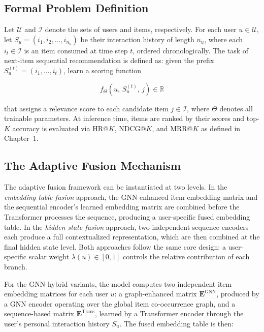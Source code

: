 \documentclass[12pt,a4paper]{report}
\begin{document}
\subsection{Formal Problem Definition}

Let \(\mathcal{U}\) and \(\mathcal{I}\) denote the sets of users and items,
respectively. For each user \(u \in \mathcal{U}\), let
\(S_u = (i_1, i_2, \ldots, i_{n_u})\) be their interaction history of length
\(n_u\), where each \(i_t \in \mathcal{I}\) is an item consumed at time step
\(t\), ordered chronologically. The task of next-item sequential recommendation
is defined as: given the prefix \(S_u^{(t)} = (i_1, \ldots, i_t)\), learn a
scoring function

\begin{equation}
    f_{\Theta}\!\left(u,\, S_u^{(t)},\, j\right) \in \mathbb{R}
    \label{eq:scoring}
\end{equation}

\noindent that assigns a relevance score to each candidate item
\(j \in \mathcal{I}\), where \(\Theta\) denotes all trainable parameters. At
inference time, items are ranked by their scores and top-\(K\) accuracy is
evaluated via HR@\(K\), NDCG@\(K\), and MRR@\(K\) as defined in
Chapter~1.

\subsection{The Adaptive Fusion Mechanism}

The adaptive fusion framework can be instantiated at two levels. In the
\textit{embedding table fusion} approach, the GNN-enhanced item embedding
matrix and the sequential encoder's learned embedding matrix are combined
before the Transformer processes the sequence, producing a user-specific
fused embedding table. In the \textit{hidden state fusion} approach, two
independent sequence encoders each produce a full contextualized
representation, which are then combined at the final hidden state level. Both
approaches follow the same core design: a user-specific scalar weight
\(\lambda(u) \in [0, 1]\) controls the relative contribution of each branch.

For the GNN-hybrid variants, the model computes two independent item embedding
matrices for each user \(u\): a graph-enhanced matrix
\(\mathbf{E}^{\text{GNN}}\), produced by a GNN encoder operating over the
global item co-occurrence graph, and a sequence-based matrix
\(\mathbf{E}^{\text{Trans}}\), learned by a Transformer encoder through the
user's personal interaction history \(S_u\). The fused embedding table is then:
\end{document}
